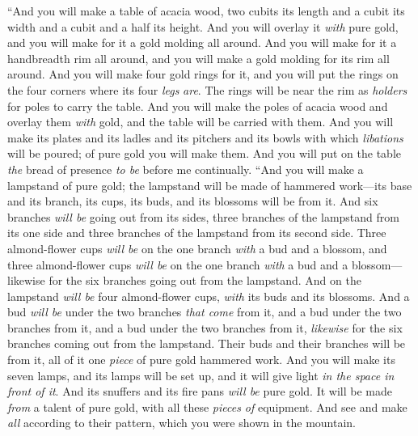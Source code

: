 \begin{biblechapter}
 “And you will make a table of acacia wood, two cubits its length and a cubit its width and a cubit and a half its height.
\verse And you will overlay it \textit{with} pure gold, and you will make for it a gold molding all around.
\verse And you will make for it a handbreadth rim all around, and you will make a gold molding for its rim all around.
\verse And you will make four gold rings for it, and you will put the rings on the four corners where its four \textit{legs} \textit{are}.
\verse The rings will be near the rim as \textit{holders} for poles to carry the table.
\verse And you will make the poles of acacia wood and overlay them \textit{with} gold, and the table will be carried with them.
\verse And you will make its plates and its ladles and its pitchers and its bowls with which \textit{libations} will be poured; of pure gold you will make them.
\verse And you will put on the table \textit{the} bread of presence \textit{to be} before me continually.
\verse “And you will make a lampstand of pure gold; the lampstand will be made of hammered work—its base and its branch, its cups, its buds, and its blossoms will be from it.
\verse And six branches \textit{will be} going out from its sides, three branches of the lampstand from its one side and three branches of the lampstand from its second side.
\verse Three almond-flower cups \textit{will be} on the one branch \textit{with} a bud and a blossom, and three almond-flower cups \textit{will be} on the one branch \textit{with} a bud and a blossom—likewise for the six branches going out from the lampstand.
\verse And on the lampstand \textit{will be} four almond-flower cups, \textit{with} its buds and its blossoms.
\verse And a bud \textit{will be} under the two branches \textit{that come} from it, and a bud under the two branches from it, and a bud under the two branches from it, \textit{likewise} for the six branches coming out from the lampstand.
\verse Their buds and their branches will be from it, all of it one \textit{piece} of pure gold hammered work.
\verse And you will make its seven lamps, and its lamps will be set up, and it will give light \textit{in the space in front of it}.
\verse And its snuffers and its fire pans \textit{will be} pure gold.
\verse It will be made \textit{from} a talent of pure gold, with all these \textit{pieces of} equipment.
\verse And see and make \textit{all} according to their pattern, which you were shown in the mountain.
\end{biblechapter}

